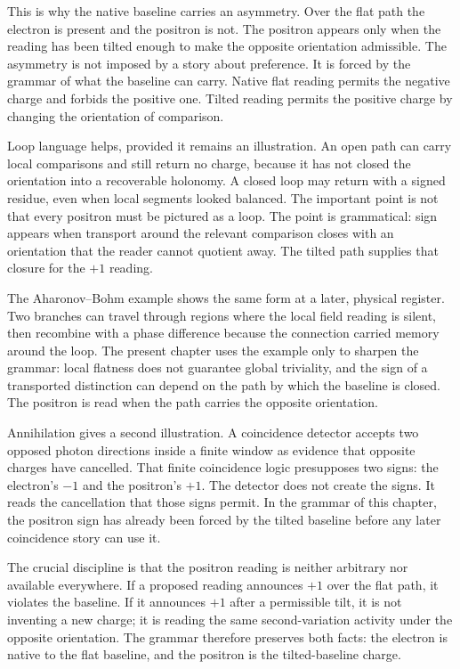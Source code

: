 This is why the native baseline carries an asymmetry. Over the flat path the
electron is present and the positron is not. The positron appears only when
the reading has been tilted enough to make the opposite orientation
admissible. The asymmetry is not imposed by a story about preference. It is
forced by the grammar of what the baseline can carry. Native flat reading
permits the negative charge and forbids the positive one. Tilted reading
permits the positive charge by changing the orientation of comparison.

Loop language helps, provided it remains an illustration. An open path can
carry local comparisons and still return no charge, because it has not
closed the orientation into a recoverable holonomy. A closed loop may return
with a signed residue, even when local segments looked balanced. The
important point is not that every positron must be pictured as a loop. The
point is grammatical: sign appears when transport around the relevant
comparison closes with an orientation that the reader cannot quotient away.
The tilted path supplies that closure for the \(+1\) reading.

The Aharonov--Bohm example shows the same form at a later, physical register.
Two branches can travel through regions where the local field reading is
silent, then recombine with a phase difference because the connection carried
memory around the loop. The present chapter uses the example only to sharpen
the grammar: local flatness does not guarantee global triviality, and the
sign of a transported distinction can depend on the path by which the
baseline is closed. The positron is read when the path carries the opposite
orientation.

Annihilation gives a second illustration. A coincidence detector accepts two
opposed photon directions inside a finite window as evidence that opposite
charges have cancelled. That finite coincidence logic presupposes two signs:
the electron's \(-1\) and the positron's \(+1\). The detector does not create
the signs. It reads the cancellation that those signs permit. In the grammar
of this chapter, the positron sign has already been forced by the tilted
baseline before any later coincidence story can use it.

The crucial discipline is that the positron reading is neither arbitrary nor
available everywhere. If a proposed reading announces \(+1\) over the flat
path, it violates the baseline. If it announces \(+1\) after a permissible
tilt, it is not inventing a new charge; it is reading the same
second-variation activity under the opposite orientation. The grammar
therefore preserves both facts: the electron is native to the flat baseline,
and the positron is the tilted-baseline charge.

